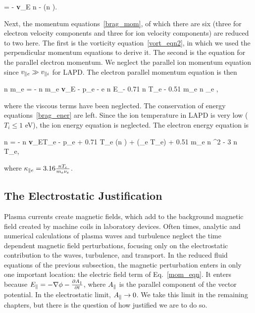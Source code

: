 \beq
\label{cont_eqn}
 = - {\bf v}_{E} \cdot \grad n - \gradpar (n \vpe).
\eeq

Next, the momentum equations~\ref{brag_mom}, of which there are six (three for electron velocity components and three for ion velocity components) are reduced to two here. The first is the
vorticity equation~\ref{vort_eqn2}, in which we used the perpendicular momentum equations to derive it. The second is the equation for the parallel electron momentum. We neglect the parallel
ion momentum equation since $v_{\parallel e} \gg v_{\parallel i}$ for LAPD. The electron parallel momentum equation is then

\beq
\label{mom_eqn}
n m_e  = - n m_e {\bf v}_E \cdot \grad \vpe - \gradpar p_e - e n E_\para - 0.71 n \gradpar T_e - 0.51 m_e n \nu_e \vpe,
\eeq

where the viscous terms have been neglected. The conservation of energy equations~\ref{brag_ener} are left. Since the ion temperature in LAPD is very low ($T_i \leq 1$ eV), the ion energy
equation is neglected. The electron energy equation is~\cite{simakov2003}

\beq
\label{elec_ener}
 n  = -  n {\bf v}_E\cdot \grad T_e - p_e \gradpar \vpe + 0.71 T_e \grad \cdot (n \vpe) + \gradpar (\kappa_{\para e} \gradpar T_e) + 0.51 m_e n \nue \vpe^2 - 3  n \nue T_e,
\eeq

where $\kappa_{\parallel e} = 3.16 \frac{n T_e}{m_e \nu_{e}}$.

\subsection{The Electrostatic Justification}
\label{ss_es_justification}

Plasma currents create magnetic fields, which add to the background magnetic field created by machine coils in laboratory devices. Often times, analytic and numerical calculations
of plasma waves and turbulence neglect the time dependent magnetic field perturbations, focusing only on the electrostatic contribution to the waves, turbulence, and transport.
In the reduced fluid equations of the previous subsection, the magnetic perturbation enters in only one important location: the electric field term of Eq.~\ref{mom_eqn}. It enters
because $E_\parallel = -\nabla \phi - \frac{\partial A_\parallel}{\partial t}$, where $A_\parallel$ is the parallel component of the vector potential. In the electrostatic limit, $A_\parallel \rightarrow 0$. We take
this limit in the remaining chapters, but there is the question of how justified we are to do so. 

